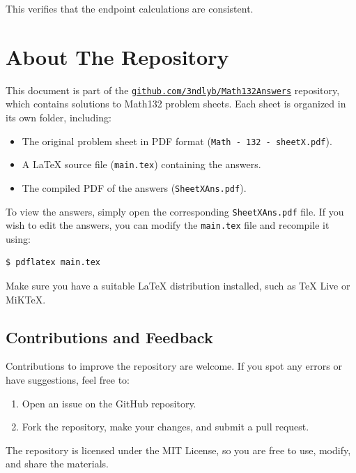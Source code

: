 \documentclass{article}
\begin{document}
This verifies that the endpoint calculations are consistent.



\section*{About The Repository}

This document is part of the \href{https://github.com/3ndlyb/Math132Answers}{\texttt{github.com/3ndlyb/Math132Answers}} repository, which contains solutions to Math132 problem sheets. Each sheet is organized in its own folder, including:

\begin{itemize}
    \item The original problem sheet in PDF format (\texttt{Math - 132 - sheetX.pdf}).
    \item A \LaTeX{} source file (\texttt{main.tex}) containing the answers.
    \item The compiled PDF of the answers (\texttt{SheetXAns.pdf}).
\end{itemize}

To view the answers, simply open the corresponding \texttt{SheetXAns.pdf} file. If you wish to edit the answers, you can modify the \texttt{main.tex} file and recompile it using:

\begin{tcolorbox}[terminal]
\begin{verbatim}
$ pdflatex main.tex
\end{verbatim}
\end{tcolorbox}


Make sure you have a suitable \LaTeX{} distribution installed, such as TeX Live or MiKTeX.

\subsection*{Contributions and Feedback}

Contributions to improve the repository are welcome. If you spot any errors or have suggestions, feel free to:
\begin{enumerate}
    \item Open an issue on the GitHub repository.
    \item Fork the repository, make your changes, and submit a pull request.
\end{enumerate}

The repository is licensed under the MIT License, so you are free to use, modify, and share the materials.  
\end{document}
